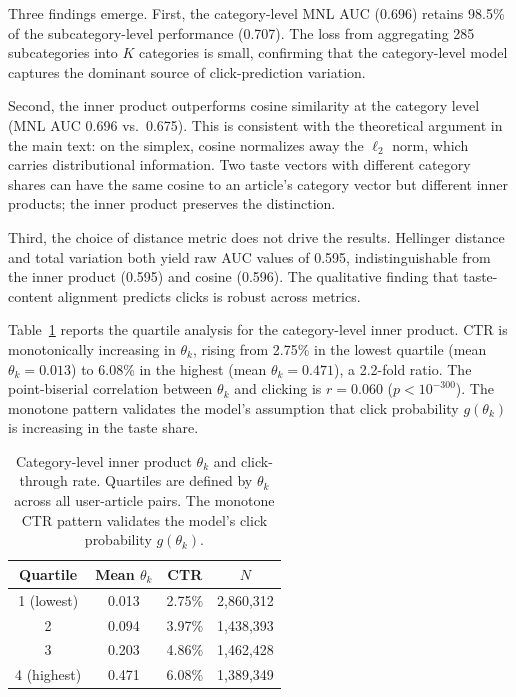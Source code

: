 \documentclass[11pt]{article}
\begin{document}
Three findings emerge. First, the category-level MNL AUC (0.696) retains 98.5\% of the subcategory-level performance (0.707). The loss from aggregating 285 subcategories into $K$ categories is small, confirming that the category-level model captures the dominant source of click-prediction variation.

Second, the inner product outperforms cosine similarity at the category level (MNL AUC 0.696 vs.\ 0.675). This is consistent with the theoretical argument in the main text: on the simplex, cosine normalizes away the $\ell_2$ norm, which carries distributional information. Two taste vectors with different category shares can have the same cosine to an article's category vector but different inner products; the inner product preserves the distinction.

Third, the choice of distance metric does not drive the results. Hellinger distance and total variation both yield raw AUC values of 0.595, indistinguishable from the inner product (0.595) and cosine (0.596). The qualitative finding that taste-content alignment predicts clicks is robust across metrics.

Table~\ref{tab:cat_quintile} reports the quartile analysis for the category-level inner product. CTR is monotonically increasing in $\theta_k$, rising from 2.75\% in the lowest quartile (mean $\theta_k = 0.013$) to 6.08\% in the highest (mean $\theta_k = 0.471$), a 2.2-fold ratio. The point-biserial correlation between $\theta_k$ and clicking is $r = 0.060$ ($p < 10^{-300}$). The monotone pattern validates the model's assumption that click probability $g(\theta_k)$ is increasing in the taste share.

\begin{table}[ht]
\centering
\caption{Category-level inner product $\theta_k$ and click-through rate. Quartiles are defined by $\theta_k$ across all user-article pairs. The monotone CTR pattern validates the model's click probability $g(\theta_k)$.}
\label{tab:cat_quintile}
\begin{tabular}{cccc}
\toprule
Quartile & Mean $\theta_k$ & CTR & $N$ \\
\midrule
1 (lowest) & 0.013 & 2.75\% & 2,860,312 \\
2 & 0.094 & 3.97\% & 1,438,393 \\
3 & 0.203 & 4.86\% & 1,462,428 \\
4 (highest) & 0.471 & 6.08\% & 1,389,349 \\
\bottomrule
\end{tabular}
\end{table}
\FloatBarrier
\end{document}
